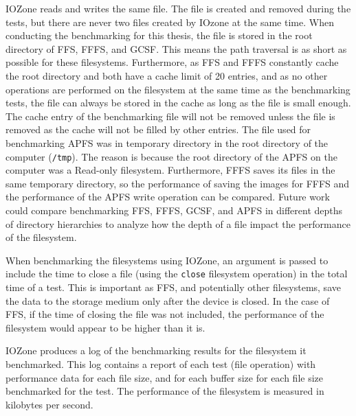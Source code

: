 IOZone reads and writes the same file. The file is created and removed during the tests, but there are never two files created by IOzone at the same time. When conducting the benchmarking for this thesis, the file is stored in the root directory of \gls{FFS}, \gls{FFFS}, and \gls{GCSF}. This means the path traversal is as short as possible for these filesystems. Furthermore, as \gls{FFS} and \gls{FFFS} constantly cache the root directory and both have a cache limit of 20 entries, and as no other operations are performed on the filesystem at the same time as the benchmarking tests, the file can always be stored in the cache as long as the file is small enough. The cache entry of the benchmarking file will not be removed unless the file is removed as the cache will not be filled by other entries. The file used for benchmarking \gls{APFS} was in temporary directory in the root directory of the computer (\texttt{/tmp}). The reason is because the root directory of the \gls{APFS} on the computer was a \mbox{Read-only} filesystem. Furthermore, \gls{FFFS} saves its files in the same temporary directory, so the performance of saving the images for \gls{FFFS} and the performance of the \gls{APFS} write operation can be compared. Future work could compare benchmarking \gls{FFS}, \gls{FFFS}, \gls{GCSF}, and \gls{APFS} in different depths of directory hierarchies to analyze how the depth of a file impact the performance of the filesystem.

When benchmarking the filesystems using IOZone, an argument is passed to include the time to close a file (using the \texttt{close} filesystem operation) in the total time of a test. This is important as \gls{FFS}, and potentially other filesystems, save the data to the storage medium only after the device is closed. In the case of \gls{FFS}, if the time of closing the file was not included, the performance of the filesystem would appear to be higher than it is.

IOZone produces a log of the benchmarking results for the filesystem it benchmarked. This log contains a report of each test (file operation) with performance data for each file size, and for each buffer size for each file size benchmarked for the test. The performance of the filesystem is measured in kilobytes per second.

